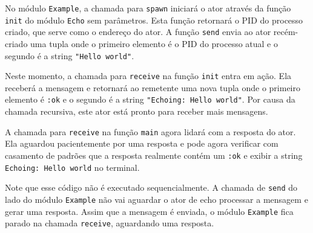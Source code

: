No módulo \texttt{Example}, a chamada para \texttt{spawn} iniciará o ator através da função \texttt{init} do módulo \texttt{Echo} sem parâmetros. Esta função retornará o PID do processo criado, que serve como o endereço do ator. A função \texttt{send} envia ao ator recém-criado uma tupla onde o primeiro elemento é o PID do processo atual e o segundo é a string \texttt{"Hello world"}.

Neste momento, a chamada para \texttt{receive} na função \texttt{init} entra em ação. Ela receberá a mensagem e retornará ao remetente uma nova tupla onde o primeiro elemento é \texttt{:ok} e o segundo é a string \texttt{"Echoing: Hello world"}. Por causa da chamada recursiva, este ator está pronto para receber mais mensagens.

A chamada para \texttt{receive} na função \texttt{main} agora lidará com a resposta do ator. Ela aguardou pacientemente por uma resposta e pode agora verificar com casamento de padrões que a resposta realmente contém um \texttt{:ok} e exibir a string \texttt{Echoing: Hello world} no terminal.

Note que esse código não é executado sequencialmente. A chamada de \texttt{send} do lado do módulo \texttt{Example} não vai aguardar o ator de echo processar a mensagem e gerar uma resposta. Assim que a mensagem é enviada, o módulo \texttt{Example} fica parado na chamada \texttt{receive}, aguardando uma resposta.
